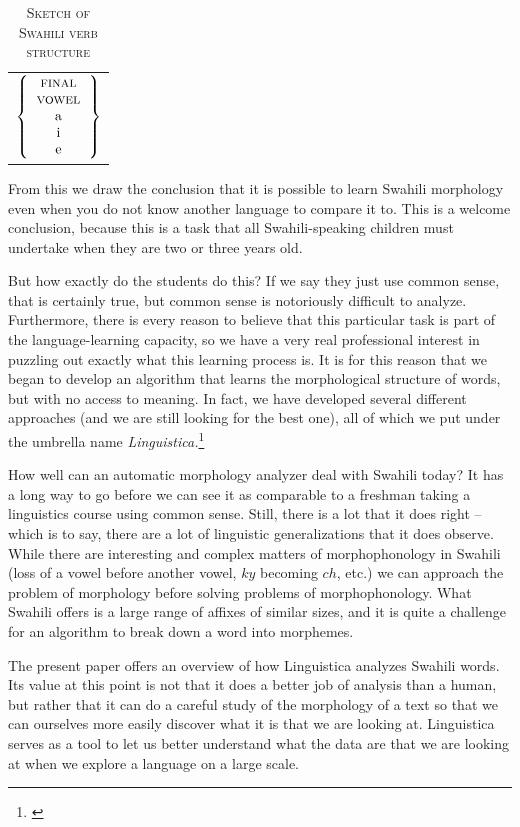 \documentclass[output=paper,colorlinks,citecolor=brown]{langscibook}
\begin{document}
\begin{table}
\begin{tabular}{l}
$\left\{ \begin{tabular}{c} \textsc{final}\\ \textsc{vowel}\\a\\i\\e  \end{tabular}  \right\}$

\end{tabular}
\caption{\textsc{Sketch of Swahili verb structure}}
\label{sketch1}
\end{table}
 
From this we draw the conclusion that it is possible to learn Swahili morphology even when you do not know another language to compare it to. This is a welcome conclusion, because this is a task that all Swahili-speaking children must undertake when they are two or three years old. 

But how exactly do the students do this? If we say they just use common sense, that is certainly true, but common sense is notoriously difficult to analyze. Furthermore, there is every reason to believe that this particular task is part of the language-learning capacity, so we have a very real professional interest in puzzling out exactly what this learning process is. It is for this reason that we began to develop an algorithm that learns the morphological structure of words, but with no access to meaning. In fact, we have developed several different approaches (and we are still looking for the best one), all of which we put under the umbrella name \textit{Linguistica.}\footnote{\citep{Goldsmith2001, Goldsmith2006, Goldsmith2010}}  

How well can an automatic morphology analyzer deal with Swahili today? It has a long way to go before we can see it as comparable to a freshman taking a linguistics course using common sense. Still, there is a lot that it does right -- which is to say, there are a lot of linguistic generalizations that it does observe. While there are interesting and complex matters of morphophonology in Swahili (loss of a vowel before another vowel, $ky$ becoming $ch$, etc.) we can approach the problem of morphology before solving problems of morphophonology. What Swahili offers is a large range of affixes of similar sizes, and it is quite a challenge for an algorithm to break down a word into morphemes.

The present paper offers an overview of how Linguistica analyzes Swahili words. Its value at this point is not that it does a better job of analysis than a human, but rather that it can do a careful study of the morphology of a text so that we can ourselves more easily discover what it is that we are looking at. Linguistica serves as a tool to let us better understand what the data are that we are looking at when we explore a language on a large scale.
\end{document}

